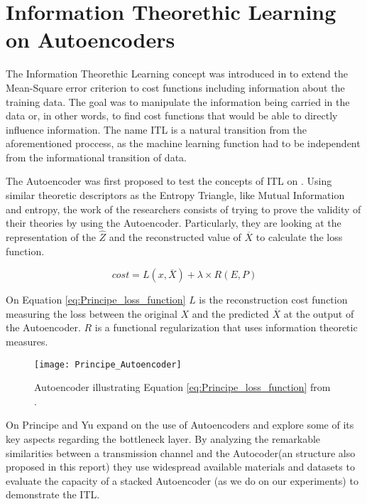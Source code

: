 \section{Information Theorethic Learning on Autoencoders}

The Information Theorethic Learning concept was introduced in \cite{Principe_2000} to extend the Mean-Square error criterion to cost functions including information about the training data. The goal was to manipulate the information being carried in the data or, in other words, to find cost functions that would be able to directly influence information. The name ITL is a natural transition from the aforementioned proccess, as the machine learning function had to be independent from the informational transition of data. \par

The Autoencoder was first proposed to test the concepts of ITL on \cite{Santana_2016}. Using similar theoretic descriptors as the Entropy Triangle, like Mutual Information and entropy, the work of the researchers consists of trying to prove the validity of their theories by using the Autoencoder. Particularly, they are looking at the representation of the $\hat{Z}$ and the reconstructed value of $\overline{X}$ to calculate the loss function.

\begin{equation}\label{eq:Principe_loss_function}
cost = L(x,\overline{X}) + \lambda \times R(E,P)
\end{equation}

On Equation \ref{eq:Principe_loss_function} $L$ is the reconstruction cost function measuring the loss between the original $X$ and the predicted $\overline{X}$ at the output of the Autoencoder. $R$ is a functional regularization that uses information theoretic measures.\par

\begin{figure}[H]
	\centering	
	\texttt{[image: Principe\_Autoencoder]}
	\caption{Autoencoder illustrating Equation \ref{eq:Principe_loss_function} from \cite{Santana_2016}.}
	\label{fig:figure_autoencoder}
\end{figure} 

On \cite{Yu_2019} Principe and Yu expand on the use of Autoencoders and explore some of its key aspects regarding the bottleneck layer. By analyzing the remarkable similarities between a transmission channel and the Autocoder(an structure also proposed in this report) they use widespread available materials and datasets to evaluate the capacity of a stacked Autoencoder (as we do on our experiments) to demonstrate the ITL. 

